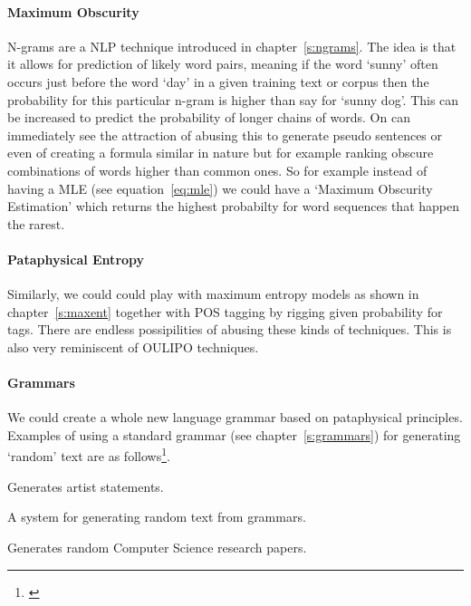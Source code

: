 \paragraph{Maximum Obscurity}
N-grams are a \ac{NLP} technique introduced in chapter~\ref{s:ngrams}. The idea is that it allows for prediction of likely word pairs, meaning if the word `sunny' often occurs just before the word `day' in a given training text or corpus then the probability for this particular n-gram is higher than say for `sunny dog'. This can be increased to predict the probability of longer chains of words. On can immediately see the attraction of abusing this to generate pseudo sentences or even of creating a formula similar in nature but for example ranking obscure combinations of words higher than common ones. So for example instead of having a \ac{MLE} (see equation~\ref{eq:mle}\marginnote{$\bm{\Sigma}$~\ref{eq:mle}}) we could have a `Maximum Obscurity Estimation' which returns the highest probabilty for word sequences that happen the rarest.

\paragraph{Pataphysical Entropy}
Similarly, we could could play with maximum entropy models as shown in chapter~\ref{s:maxent} together with \ac{POS} tagging by rigging given probability for tags. There are endless possipilities of abusing these kinds of techniques. This is also very reminiscent of \ac{OULIPO} techniques. 

\paragraph{Grammars}
We could create a whole new language grammar based on pataphysical principles. Examples of using a standard grammar (see chapter~\ref{s:grammars}) for generating `random' text are as follows\footnote{\autocite{Winter2016,Dada2016,Stribling2016}}.

\begin{adjustwidth}{1cm}{}
\begin{description}[leftmargin=3cm]
  \item[ArtyBollocks] Generates artist statements.
  \item[DadaEngine] A system for generating random text from grammars.
  \item[SciGen] Generates random Computer Science research papers.
\end{description}
\end{adjustwidth}

